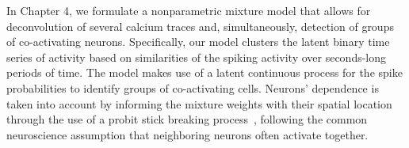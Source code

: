 In Chapter 4, we formulate a nonparametric mixture model that allows for deconvolution of several calcium traces and, simultaneously, detection of groups of co-activating neurons.
Specifically, our model clusters the latent binary time series of activity based on similarities of the spiking activity over seconds-long periods of time. 
The model makes use of a latent continuous process for the spike probabilities to identify groups of co-activating cells. Neurons' dependence is taken into account by informing the mixture weights with their spatial location through the use of a probit stick breaking process~\parencite{rodriguez2011}, following the common neuroscience assumption that neighboring neurons often activate together. 











